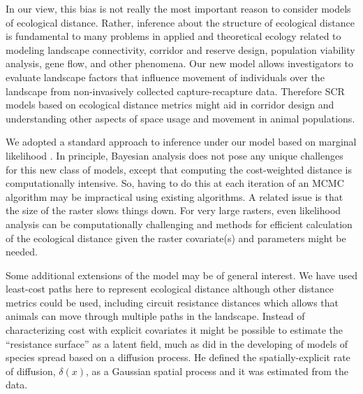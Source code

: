 In our view, this bias is not really the most important reason to
consider models of ecological distance. Rather, inference about the
structure of ecological distance is fundamental to many problems in
applied and theoretical ecology related to modeling landscape
connectivity, corridor and reserve design, population viability
analysis, gene flow, and other phenomena.  Our new model allows
investigators to evaluate landscape factors that influence movement of
individuals over the landscape from non-invasively collected
capture-recapture data.  Therefore SCR models based on ecological
distance metrics might aid in corridor design and understanding other
aspects of space usage and movement in animal populations.

We adopted a standard approach to inference under our model based on
marginal likelihood \citep{borchers_efford:2008}. In principle,
Bayesian analysis does not pose any unique challenges for this new
class of models, except that computing the cost-weighted distance is
computationally intensive.  So, having to do this at each iteration of
an MCMC algorithm may be impractical using existing algorithms.  A
related issue is that the size of the raster slows things down. For
very large rasters, even likelihood analysis can be computationally
challenging and methods for efficient calculation of the ecological
distance given the raster covariate(s) and parameters might be needed.


Some additional extensions of the model may be of general interest.
We have used least-cost paths here to represent ecological distance
although other distance metrics could be used, including circuit
resistance distances \citep{mcrae:2006} which allows that animals can
move through multiple paths in the landscape.  Instead of
characterizing cost with explicit covariates it might be possible to
estimate the ``resistance surface'' as a latent field, much as
\citep{wikle:2003} did in the developing of models of species spread
based on a diffusion process. He defined the spatially-explicit rate
of diffusion, $\delta(x)$, as a Gaussian spatial process and it was
estimated from the data.




